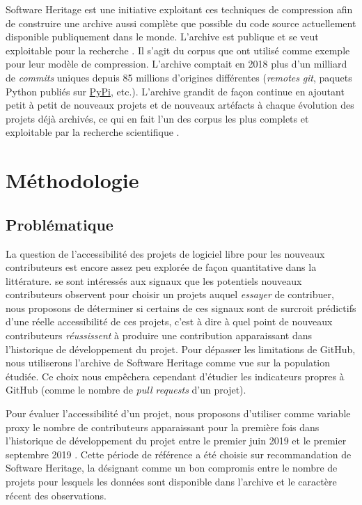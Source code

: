 \documentclass[dvipsnames,runningheads]{llncs}
\newcommand{\en}[1]{\foreignlanguage{english}{\emph{#1}}}
\begin{document}
    Software Heritage est une initiative exploitant ces techniques de compression afin de construire une
    archive aussi complète que possible du code source actuellement disponible publiquement dans le monde.
    L'archive est publique et se veut exploitable pour la recherche \parencite{swh-2017}. Il s'agit du corpus
    que \textcite{swh-graph-2020} ont utilisé comme exemple pour leur modèle de compression. L'archive
    comptait en 2018 plus d'un milliard de \en{commits} uniques depuis 85 millions d'origines différentes
    (\en{remotes} \en{git}, paquets Python publiés sur \href{https://pypi.org/}{PyPi}, etc.). L'archive
    grandit de façon continue en ajoutant petit à petit de nouveaux projets et de nouveaux artéfacts à chaque
    évolution des projets déjà archivés, ce qui en fait l'un des corpus les plus complets et exploitable par
    la recherche scientifique \parencite{swh-2019,swh-growth-2019}.

    \section{Méthodologie}

    \subsection{Problématique}

    La question de l'accessibilité des projets de logiciel libre pour les nouveaux contributeurs est encore
    assez peu explorée de façon quantitative dans la littérature. \textcite{signals-2019} se sont intéressés
    aux signaux que les potentiels nouveaux contributeurs observent pour choisir un projets auquel
    \emph{essayer} de contribuer, nous proposons de déterminer si certains de ces signaux sont de
    surcroit prédictifs d'une réelle accessibilité de ces projets, c'est à dire à quel point de nouveaux
    contributeurs \emph{réussissent} à produire une contribution apparaissant dans l'historique de
    développement du projet. Pour dépasser les limitations de GitHub, nous utiliserons l'archive de Software
    Heritage comme vue sur la population étudiée. Ce choix nous empêchera cependant d'étudier les indicateurs
    propres à GitHub (comme le nombre de \en{pull requests} d'un projet).

    Pour évaluer l'accessibilité d'un projet, nous proposons d'utiliser comme variable proxy le nombre de
    contributeurs apparaissant pour la première fois dans l'historique de développement du projet entre le
    premier juin 2019 et le premier septembre 2019 \parencite[voir section \ref{sec:accessibility-measure},
    ainsi que][p.~13,16]{signals-2019}. Cette période de référence a été choisie sur recommandation de
    Software Heritage, la désignant comme un bon compromis entre le nombre de projets pour lesquels les
    données sont disponible dans l'archive et le caractère récent des observations.
\end{document}
